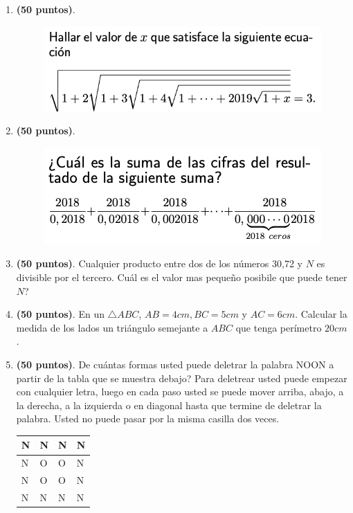 \begin{enumerate}
		\item \textbf{(50 puntos)}. 
		\begin{figure}[H]
			\centering
			\includegraphics[width=0.6\linewidth]{2020_08_15/imgs/p8selectivavanzado2019}
			\label{fig:p8selectivavanzado2019}
		\end{figure}

\item \textbf{(50 puntos)}. 
		\begin{figure}[H]
			\centering
			\includegraphics[width=0.6\linewidth]{2020_08_15/imgs/p2selectivaavanzado2018}
			\label{fig:p2selectivaavanzado2018}
\end{figure}

\item \textbf{(50 puntos)}.  Cualquier producto entre dos de los números 30,72 y $N$ es divisible por el tercero. Cuál es el valor mas pequeño posibile que puede tener $N$?

\item \textbf{(50 puntos)}. En un $\triangle ABC$, $AB=4cm,BC=5cm$ y $AC=6cm$. Calcular la medida de los lados un triángulo semejante a $ABC$ que tenga perímetro $20cm$.

\item \label{problema:15agNOON} \textbf{(50 puntos)}. De cuántas formas usted puede deletrar la palabra NOON a partir de la tabla que se muestra debajo? Para deletrear usted puede empezar con cualquier letra, luego en cada paso usted se puede mover arriba, abajo, a la derecha, a la izquierda o en diagonal hasta que termine de deletrar la palabra. Usted no puede pasar por la misma casilla dos veces. 

\begin{table}[H]
	\centering
	\begin{tabular}{|l|l|l|l|}
		\hline
		N & N & N & N \\ \hline
		N & O & O & N \\ \hline
		N & O & O & N \\ \hline
		N & N & N & N \\ \hline
	\end{tabular}
\end{table}	
\end{enumerate}